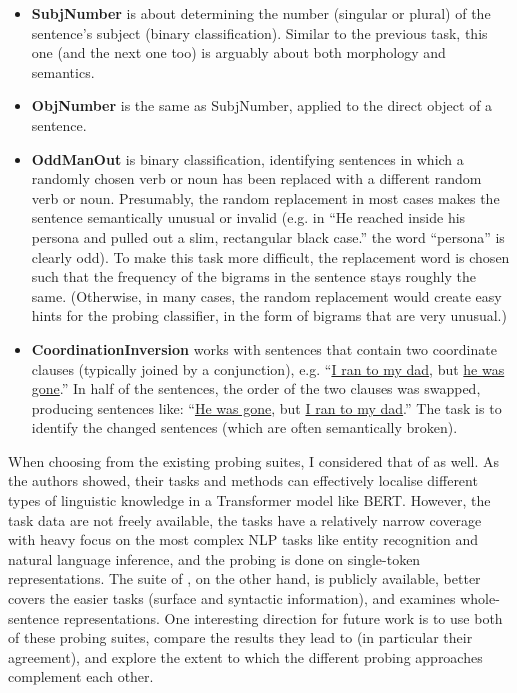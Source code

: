 \documentclass[bsc,frontabs,singlespacing,parskip,deptreport]{infthesis}
\begin{document}
{{\begin{enumerate}
{\begin{itemize}
          \item \textbf{SubjNumber} is about determining the number (singular or plural) of the sentence's subject (binary classification). Similar to the previous task, this one (and the next one too) is arguably about both morphology and semantics.
          \item \textbf{ObjNumber} is the same as SubjNumber, applied to the direct object of a sentence.
          \item \textbf{OddManOut} is binary classification, identifying sentences in which a randomly chosen verb or noun has been replaced with a different random verb or noun. Presumably, the random replacement in most cases makes the sentence semantically unusual or invalid (e.g. in ``He reached inside his persona and pulled out a slim, rectangular black case.'' the word ``persona'' is clearly odd). To make this task more difficult, the replacement word is chosen such that the frequency of the bigrams in the sentence stays roughly the same. (Otherwise, in many cases, the random replacement would create easy hints for the probing classifier, in the form of bigrams that are very unusual.)
          \item \textbf{CoordinationInversion} works with sentences that contain two coordinate clauses (typically joined by a conjunction), e.g. ``\underline{I ran to my dad}, but \underline{he was gone}.'' In half of the sentences, the order of the two clauses was swapped, producing sentences like: ``\underline{He was gone}, but \underline{I ran to my dad}.'' The task is to identify the changed sentences (which are often semantically broken).
        \end{itemize}
      }
    \end{enumerate}

    When choosing from the existing probing suites, I considered that of \citet{Tenney_2019b} as well. As the authors showed, their tasks and methods can effectively localise different types of linguistic knowledge in a Transformer model like BERT.
    However, the task data are not freely available, the tasks have a relatively narrow coverage with heavy focus on the most complex NLP tasks like entity recognition and natural language inference, and the probing is done on single-token representations.
    The suite of \citeauthor{Conneau_2018}, on the other hand, is publicly available, better covers the easier tasks (surface and syntactic information), and examines whole-sentence representations.
    One interesting direction for future work is to use both of these probing suites, compare the results they lead to (in particular their agreement), and explore the extent to which the different probing approaches complement each other.
  }

}
\end{document}
